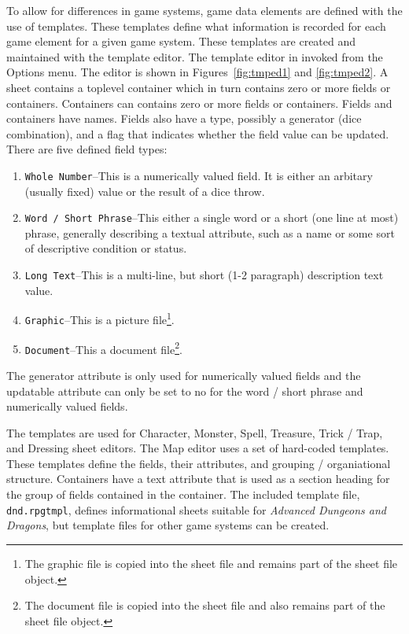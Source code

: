 To allow for differences in game systems, game data elements are
defined with the use of templates.  These templates define what
information is recorded for each game element for a given game system. 
These templates are created and maintained with the template editor. 
The template editor in invoked from the Options menu.  The editor is
shown in Figures~\ref{fig:tmped1} and \ref{fig:tmped2}.  A sheet
contains a toplevel container which in turn contains zero or more fields
or containers.  Containers can contains zero or more fields or
containers.  Fields and containers have names. Fields also have a type,
possibly a generator (dice combination), and a flag that indicates whether the
field value can be updated.  There are five defined field types:

\begin{enumerate}
\item \verb=Whole Number=--This is a numerically valued field. It is either
an arbitary (usually fixed) value or the result of a dice throw.
\item \verb=Word / Short Phrase=--This either a single word or a short
(one line at most) phrase, generally describing a textual attribute,
such as a name or some sort of descriptive condition or status.
\item \verb=Long Text=--This is a multi-line, but short (1-2 paragraph)
description text value.
\item \verb=Graphic=--This is a picture file\footnote{The graphic file
is copied into the sheet file and remains part of the sheet file object.}.
\item \verb=Document=--This a document file\footnote{The document file
is copied into the sheet file and also remains part of the sheet file
object.}.
\end{enumerate}

The generator attribute is only used for numerically valued fields and
the updatable attribute can only be set to no for the word / short
phrase and numerically valued fields.

The templates are used for Character, Monster, Spell, Treasure, Trick /
Trap, and Dressing sheet editors.  The Map editor uses a set of hard-coded
templates. These templates define the fields, their attributes, and
grouping / organiational structure.  Containers have a text attribute
that is used as a section heading for the group of fields contained in
the container. The included template file, \verb=dnd.rpgtmpl=, defines
informational sheets suitable for \textit{Advanced Dungeons and
Dragons}, but template files for other game systems can be created.

